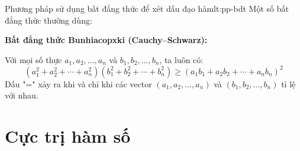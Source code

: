 \begin{lythuyetbox}{Phương pháp sử dụng bất đẳng thức để xét dấu đạo hàm}{lt:pp-bdt}
    Một số bất đẳng thức thường dùng:
    
    \textbf{Bất đẳng thức Bunhiacopxki (Cauchy–Schwarz):}
    
    Với mọi số thực $a_1, a_2, \ldots, a_n$ và $b_1, b_2, \ldots, b_n$, ta luôn có:
    \[
    (a_1^2 + a_2^2 + \cdots + a_n^2)(b_1^2 + b_2^2 + \cdots + b_n^2) \geq (a_1b_1 + a_2b_2 + \cdots + a_nb_n)^2
    \]
    Dấu "=" xảy ra khi và chỉ khi các vector $(a_1, a_2, ..., a_n)$ và $(b_1, b_2, ..., b_n)$ tỉ lệ với nhau.
    
\end{lythuyetbox}

\section{Cực trị hàm số}

